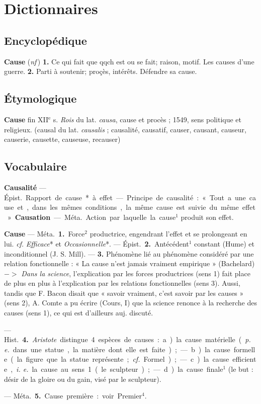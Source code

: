 
\section{Dictionnaires}
\subsection{Encyclopédique}
{\bf Cause} ({\it nf}\,) {\bf 1.} Ce qui fait que qqch est ou se fait; raison, motif. Les causes d'une guerre. {\bf 2.} Parti à soutenir; proçès, intérêts. Défendre sa cause.

\subsection{Étymologique}
{\bf Cause} fin {\footnotesize XII}$^\text{e}$ s. {\it Rois} du lat. {\it causa}, cause et procès ; 1549, sens politique et religieux.
{\footnotesize (causal du lat. {\it causalis} ; causalité, causatif, causer, causant, causeur, causerie, causette, causeuse, recauser)}

\subsection{Vocabulaire}

{\bf Causalité} — \si{Épist.} Rapport de cause*
à effet. — Principe de causalité :
« Tout a une cause et, dans les
mêmes conditions, la même cause
est suivie du même effet. »

{\bf Causation} — \si{Méta.} Action par laquelle la cause$^1$ produit son effet.

{\bf Cause} — \si{Méta.} {\bf 1.} Force$^2$ productrice,
engendrant l'effet et se prolongeant
en lui. {\it cf.} {\it Efficace}* et {\it Occasionnelle}*. — \si{Épist.} {\bf 2.} Antécédent$^1$
constant (Hume) et inconditionnel
(J. S. Mill). — {\bf 3.} Phénomène lié au
phénomène considéré par une relation fonctionnelle : « La cause n’est
jamais vraiment empirique » (Bachelard) $->$ {\it Dans la science}, l'explication par les forces productrices
(sens 1) fait place de plus en plus à
l’explication par les relations fonctionnelles (sens 3). Aussi, tandis
que F. Bacon disait que « savoir
vraiment, c’est savoir par les causes »
(sens 2), A. Comte a pu écrire
(Cours, I) que la science renonce à
la recherche des causes (sens 1), ce
qui est d'ailleurs auj. discuté.

— \si{Hist.} {\bf 4.} {\it Aristote} distingue
4 espèces de causes : a) la cause matérielle ({\it p. e.} dans une statue, la
matière dont elle est faite); — b) la
cause formelle (la figure que la statue
représente; {\it cf.} Formel); — c) la
cause efficiente, {\it i. e.} la cause au sens 1
(le sculpteur); — d) la cause finale$^1$
(le but : désir de la gloire ou du gain,
visé par le sculpteur).

— \si{Méta.} {\bf 5.} Cause première : voir
Premier$^4$.

